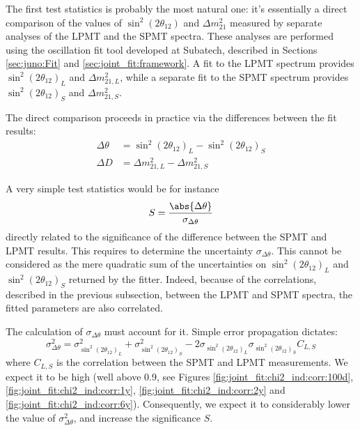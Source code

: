 \documentclass[../main.tex]{subfiles}
\begin{document}
The first test statistics is probably the most natural one: it's essentially a direct comparison of the values of $\sin^2(2\theta_{12})$ and $\Delta m^2_{21}$ measured by separate analyses of the LPMT and the SPMT spectra. These analyses are performed using the oscillation fit tool developed at Subatech, described in Sections \ref{sec:juno:Fit} and \ref{sec:joint_fit:framework}.
A fit to the LPMT spectrum provides  $\sin^2(2\theta_{12})_L$ and $\Delta m^2_{21,L}$, while a separate fit to the SPMT spectrum provides $\sin^2(2\theta_{12})_S$ and $\Delta m^2_{21,S}$.

The direct comparison proceeds in practice via the differences between the fit results:
\begin{align}
  \Delta \theta &= \sin^2(2\theta_{12})_L  - \sin^2(2\theta_{12})_S \label{eq:joint_fit:delta_t} \\
  \Delta D   &= \Delta m^2_{21,L}  - \Delta m^2_{21,S} \label{eq:joint_fit:delta_d}
\end{align}

\hfill

A very simple test statistics would be for instance
\begin{equation}
  S = \frac{\abs{ \Delta \theta}}{ \sigma_{\Delta \theta} }
\end{equation}
directly related to the significance of the difference between the SPMT and LPMT results. This requires to determine the uncertainty $\sigma_{\Delta \theta}$. This cannot be considered as the mere quadratic sum of the uncertainties on $\sin^2(2\theta_{12})_L$ and $\sin^2(2\theta_{12})_S$ returned by the fitter. Indeed, because of the correlations, described in the previous subsection, between the LPMT and SPMT spectra, the fitted parameters are also correlated.

The calculation of $\sigma_{\Delta \theta}$ must account for it. Simple error propagation dictates:
\begin{equation}
\sigma^2_{\Delta \theta} = \sigma^2_{\sin^2(2\theta_{12})_L} + \sigma^2_{\sin^2(2\theta_{12})_S} - 2\sigma_{\sin^2(2\theta_{12})_L}\sigma_{\sin^2(2\theta_{12})_S}C_{L,S}
\end{equation}
where $C_{L,S}$ is the correlation  between the SPMT and LPMT measurements. We expect it to be high (well above 0.9, see Figures \ref{fig:joint_fit:chi2_ind:corr:100d}, \ref{fig:joint_fit:chi2_ind:corr:1y}, \ref{fig:joint_fit:chi2_ind:corr:2y} and \ref{fig:joint_fit:chi2_ind:corr:6y}). Consequently, we expect it to considerably lower the value of $\sigma^2_{\Delta \theta}$, and increase the significance $S$.
\hfill
\end{document}
